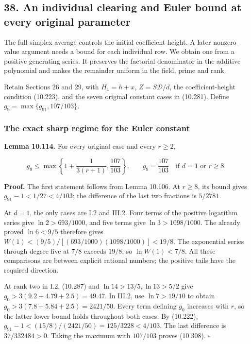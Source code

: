 \documentclass[
  11pt,
  a4paper,
]{article}
\begin{document}
\subsection{38. An individual clearing and Euler bound at every original
parameter}\label{an-individual-clearing-and-euler-bound-at-every-original-parameter}

The full-simplex average controls the initial coefficient height. A
later nonzero-value argument needs a bound for each individual row. We
obtain one from a positive generating series. It preserves the factorial
denominator in the additive polynomial and makes the remainder uniform
in the field, prime and rank.

Retain Sections 26 and 29, with \(H_1=h+x\), \(Z=S\mathcal D/d\), the
coefficient-height condition (10.223), and the seven original constant
cases in (10.281). Define \(g_9=\max\{g_{91},107/103\}\).

\subsubsection{The exact sharp regime for the Euler
constant}\label{the-exact-sharp-regime-for-the-euler-constant}

\textbf{Lemma 10.114.} For every original case and every \(r\ge2\),

\[
g_9\le\max\left\{1+\frac1{3(r+1)},\frac{107}{103}\right\}.
\qquad
g_9=\frac{107}{103}\quad\text{if }d=1\text{ or }r\ge8.
\tag{10.308}
\]

\textbf{Proof.} The first statement follows from Lemma 10.106. At
\(r\ge8\), its bound gives \(g_{91}-1<1/27<4/103\); the difference of
the last two fractions is \(5/2781\).

At \(d=1\), the only cases are I.2 and III.2. Four terms of the positive
logarithm series give \(\ln2>693/1000\), and five terms give
\(\ln3>1098/1000\). The already proved \(\ln6<9/5\) therefore gives
\(W(1)<(9/5)/[(693/1000)(1098/1000)]<19/8\). The exponential series
through degree five at \(7/8\) exceeds \(19/8\), so \(\ln W(1)<7/8\).
All these comparisons are between explicit rational numbers; the
positive tails have the required direction.

At rank two in I.2, (10.287) and \(\ln14>13/5,\ln13>5/2\) give
\(g_0>3(9.2+4.79+2.5)=49.47\). In III.2, use \(\ln7>19/10\) to obtain
\(g_0>3(7.8+5.84+2.5)=2421/50\). Every term defining \(g_0\) increases
with \(r\), so the latter lower bound holds throughout both cases. By
(10.222), \(g_{91}-1<(15/8)/(2421/50)=125/3228<4/103\). The last
difference is \(37/332484>0\). Taking the maximum with \(107/103\)
proves (10.308). \(\square\)
\end{document}
